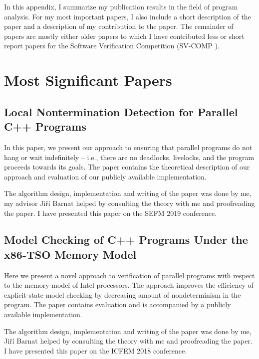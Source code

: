 In this appendix, I summarize my publication results in the field of program analysis.
For my most important papers, I also include a short description of the paper and a description of my contribution to the paper.
The remainder of papers are mostly either older papers to which I have contributed less or short report papers for the Software Verification Competition (SV-COMP ).

\section{Most Significant Papers}

\subsection*{Local Nontermination Detection for Parallel C++ Programs}

In this paper, we present our approach to ensuring that parallel programs do not hang or wait indefinitely – i.e., there are no deadlocks, livelocks, and the program proceeds towards its goals.
The paper contains the theoretical description of our approach and evaluation of our publicly available implementation.

The algorithm design, implementation and writing of the paper was done by me, my advisor Jiří Barnat helped by consulting the theory with me and proofreading the paper.
I have presented this paper on the SEFM 2019 conference.

\bigskip\noindent{}

\subsection*{Model Checking of C++ Programs Under the x86-TSO Memory Model}

Here we present a novel approach to verification of parallel programs with respect to the memory model of Intel processors.
The approach improves the efficiency of explicit-state model checking by decreasing amount of nondeterminism in the program.
The paper contains evaluation and is accompanied by a publicly available implementation.

The algorithm design, implementation and writing of the paper was done by me, Jiří Barnat helped by consulting the theory with me and proofreading the paper.
I have presented this paper on the ICFEM 2018 conference.

\bigskip\noindent{}

